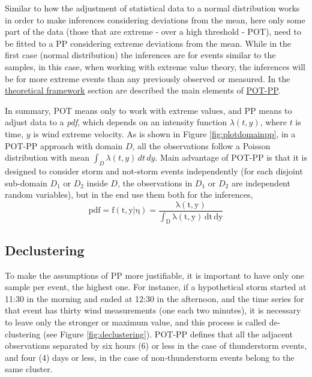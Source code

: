 \documentclass[12pt,oneside]{reedthesis}
\begin{document}
Similar to how the adjustment of statistical data to a normal distribution works in order to make inferences considering deviations from the mean, here only some part of the data (those that are extreme - over a high threshold - POT), need to be fitted to a PP considering extreme deviations from the mean. While in the first case (normal distribution) the inferences are for events similar to the samples, in this case, when working with extreme value theory, the inferences will be for more extreme events than any previously observed or measured. In the \protect\hyperlink{rmd-thefra}{theoretical framework} section are described the main elements of \protect\hyperlink{pot-pp}{POT-PP}.

In summary, POT means only to work with extreme values, and PP means to adjust data to a \emph{pdf}, which depends on an intensity function \(\lambda(t,y)\), where \(t\) is time, \(y\) is wind extreme velocity. As is shown in Figure \ref{fig:plotdomainpp}, in a POT-PP approach with domain \(D\), all the observations follow a Poisson distribution with mean \(\int_D\lambda(t,y)\,dt\,dy\). Main advantage of POT-PP is that it is designed to consider storm and not-storm events independently (for each disjoint sub-domain \(D_1\) or \(D_2\) inside \(D\), the observations in \(D_1\) or \(D_2\) are independent random variables), but in the end use them both for the inferences,
\begin{equation}
  \mathrm{
          pdf = f(t,y|\eta) = \frac{\lambda(t,y)}{\int_D\lambda(t,y)\,dt\,dy}
        }
  \label{eq:pppdf}
\end{equation}
\hypertarget{decluster}{%
\subsection{Declustering}\label{decluster}}

To make the assumptions of PP more justifiable, it is important to have only one sample per event, the highest one. For instance, if a hypothetical storm started at 11:30 in the morning and ended at 12:30 in the afternoon, and the time series for that event has thirty wind measurements (one each two minutes), it is necessary to leave only the stronger or maximum value, and this process is called de-clustering (see Figure \ref{fig:declustering}). POT-PP defines that all the adjacent observations separated by six hours (6) or less in the case of thunderstorm events, and four (4) days or less, in the case of non-thunderstorm events belong to the same cluster.
\end{document}
